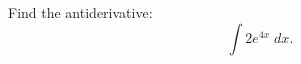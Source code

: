 \documentclass{ximera}
\author{Emma Smith Zbarsky\and Nela Lakos}
\begin{document}
\begin{exercise}

Find the antiderivative: \[\int 2e^{4x}\; dx.\]





\begin{multipleChoice}
\end{multipleChoice}

\end{exercise}
\end{document}
